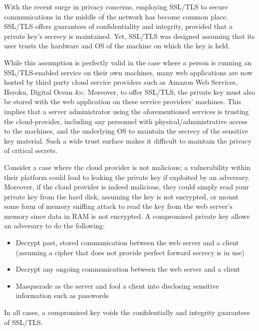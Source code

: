 \documentclass[../main.tex]{subfiles}
\begin{document}
With the recent surge in privacy concerns, employing SSL/TLS to secure
communications in the middle of the network has become common
place. SSL/TLS offers guarantees of confidentiality and integrity,
provided that a private key's secrecy is maintained. Yet, SSL/TLS was
designed assuming that its user trusts the hardware and OS of the
machine on which the key is held.
 
While this assumption is perfectly valid in the case where a person is
running an SSL/TLS-enabled service on their own machines, many web
applications are now hosted by third party cloud service providers
such as Amazon Web Services, Heroku, Digital Ocean \&c. Moreover, to
offer SSL/TLS, the private key must also be stored with the web
application on these service providers' machines. This implies that a
server administrator using the aforementioned services is trusting the
cloud-provider, including any personnel with physical/administrative
access to the machines, and the underlying OS to maintain the secrecy
of the sensitive key material. Such a wide trust surface makes it
difficult to maintain the privacy of critical secrets.


Consider a case where the cloud provider is not malicious; a
vulnerability within their platform could lead to leaking the private
key if exploited by an adversary. Moreover, if the cloud provider is
indeed malicious, they could simply read your private key from the hard
disk, assuming the key is not encrypted, or mount some form of memory
sniffing attack to read the key from the web server's memory since
data in RAM is not encrypted. A compromised private key allows an
adversary to do the following:
\begin{itemize}
  \item Decrypt past, stored communication between the web server and a
    client (assuming a cipher that does not provide perfect forward
    secrecy is in use)
  \item Decrypt any ongoing communication between the web server and a
    client
  \item Masquerade as the server and fool a client into disclosing
    sensitive information such as passwords
\end{itemize}
In all cases, a compromised key voids the confidentially and integrity
guarantees of SSL/TLS.
\end{document}
